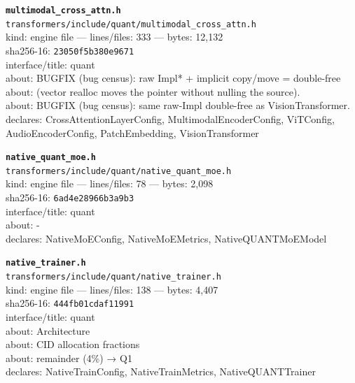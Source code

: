 \noindent\textbf{\texttt{multimodal\_cross\_attn.h}}\\
\texttt{transformers/include/quant/multimodal\_cross\_attn.h}\\
kind: engine file --- lines/files: 333 --- bytes: 12,132\\
sha256-16: \texttt{23050f5b380e9671}\\
interface/title: quant\\
about: BUGFIX (bug census): raw Impl* + implicit copy/move = double-free\\
about: (vector realloc moves the pointer without nulling the source).\\
about: BUGFIX (bug census): same raw-Impl double-free as VisionTransformer.\\
declares: CrossAttentionLayerConfig, MultimodalEncoderConfig, ViTConfig, AudioEncoderConfig, PatchEmbedding, VisionTransformer\\
\vspace*{6.0pt}
\newpage

\noindent\textbf{\texttt{native\_quant\_moe.h}}\\
\texttt{transformers/include/quant/native\_quant\_moe.h}\\
kind: engine file --- lines/files: 78 --- bytes: 2,098\\
sha256-16: \texttt{6ad4e28966b3a9b3}\\
interface/title: quant\\
about: -\\
declares: NativeMoEConfig, NativeMoEMetrics, NativeQUANTMoEModel\\
\vspace*{6.0pt}

\noindent\textbf{\texttt{native\_trainer.h}}\\
\texttt{transformers/include/quant/native\_trainer.h}\\
kind: engine file --- lines/files: 138 --- bytes: 4,407\\
sha256-16: \texttt{444fb01cdaf11991}\\
interface/title: quant\\
about: Architecture\\
about: CID allocation fractions\\
about: remainder (4\%) → Q1\\
declares: NativeTrainConfig, NativeTrainMetrics, NativeQUANTTrainer\\
\vspace*{6.0pt}

